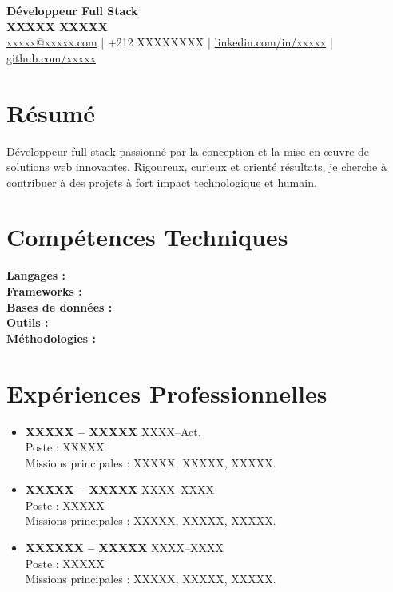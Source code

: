 \documentclass[a4paper,11pt]{article}
\begin{document}
\fontsize{11pt}{13pt}\selectfont

\begin{center}
    {\Huge \textbf{Développeur Full Stack}} \\[4pt]
    {\Large \textbf{XXXXX XXXXX}} \\[6pt]
    \href{mailto:xxxxx@xxxxx.com}{xxxxx@xxxxx.com} \quad | \quad +212 XXXXXXXX \quad | \quad 
    \href{https://www.linkedin.com/in/xxxxx}{linkedin.com/in/xxxxx} \quad | \quad 
    \href{https://github.com/xxxxx}{github.com/xxxxx}
\end{center}

\vspace{0.8em}

\section*{Résumé}
Développeur full stack passionné par la conception et la mise en œuvre de solutions web innovantes. Rigoureux, curieux et orienté résultats, je cherche à contribuer à des projets à fort impact technologique et humain.

\section*{Compétences Techniques}
\textbf{Langages :}  \\
\textbf{Frameworks :} \\
\textbf{Bases de données :} \\
\textbf{Outils :}  \\
\textbf{Méthodologies :} 

\section*{Expériences Professionnelles}
\begin{itemize}[leftmargin=0.8em,itemsep=1pt]
  \item \textbf{XXXXX – XXXXX} \hfill XXXX--Act. \\
  Poste : XXXXX \\
  Missions principales : XXXXX, XXXXX, XXXXX.
  
  \item \textbf{XXXXX – XXXXX} \hfill XXXX--XXXX \\
  Poste : XXXXX \\
  Missions principales : XXXXX, XXXXX, XXXXX.
  
  \item \textbf{XXXXXX – XXXXX} \hfill XXXX--XXXX \\
  Poste : XXXXX \\
  Missions principales : XXXXX, XXXXX, XXXXX.
\end{itemize}
\end{document}
